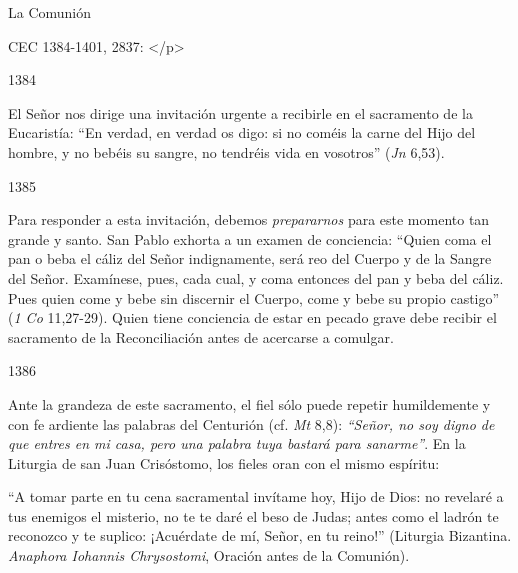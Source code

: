 			\begin{ccecite}[AHMA 50, 589]\end{ccecite}
			
			\begin{ccetheme}La Comunión \end{ccetheme}
			
			\begin{ccereference}\end{ccereference}CEC 1384-1401, 2837: </p>
			
			\begin{ccebody}\begin{ccenumber}1384\end{ccenumber} El Señor nos dirige una invitación urgente a recibirle en el sacramento de la Eucaristía: “En verdad, en verdad os digo: si no coméis la carne del Hijo del hombre, y no bebéis su sangre, no tendréis vida en vosotros” (\textit{Jn} 6,53).\end{ccebody}
			
			\begin{ccebody}\begin{ccenumber}1385\end{ccenumber} Para responder a esta invitación, debemos \textit{prepararnos} para este momento tan grande y santo. San Pablo exhorta a un examen de conciencia: “Quien coma el pan o beba el cáliz del Señor indignamente, será reo del Cuerpo y de la Sangre del Señor. Examínese, pues, cada cual, y coma entonces del pan y beba del cáliz. Pues quien come y bebe sin discernir el Cuerpo, come y bebe su propio castigo” (\textit{1 Co} 11,27-29). Quien tiene conciencia de estar en pecado grave debe recibir el sacramento de la Reconciliación antes de acercarse a comulgar.\end{ccebody}
			
			\begin{ccebody}\begin{ccenumber}1386\end{ccenumber} Ante la grandeza de este sacramento, el fiel sólo puede repetir humildemente y con fe ardiente las palabras del Centurión (cf. \textit{Mt} 8,8): \textit{“Señor, no soy digno de que entres en mi casa, pero una palabra tuya bastará para sanarme”}. En la Liturgia de san Juan Crisóstomo, los fieles oran con el mismo espíritu:\end{ccebody}
			
			\begin{ccecite}“A tomar parte en tu cena sacramental invítame hoy, Hijo de Dios: no revelaré a tus enemigos el misterio, no te te daré el beso de Judas; antes como el ladrón te reconozco y te suplico: ¡Acuérdate de mí, Señor, en tu reino!” (Liturgia Bizantina. \textit{Anaphora Iohannis Chrysostomi}, Oración antes de la Comunión).\end{ccecite}
			
